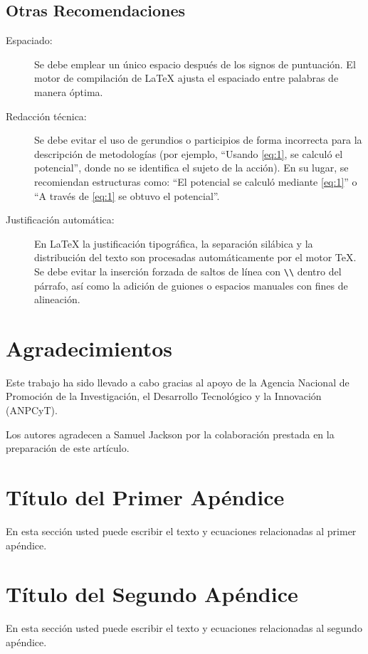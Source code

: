 \documentclass[a4paper, 12pt]{article}
\begin{document}
\subsection{Otras Recomendaciones}

\begin{description}
  \item[Espaciado:] Se debe emplear un único espacio después de los signos de puntuación. El motor de compilación de \LaTeX{} ajusta el espaciado entre palabras de manera óptima.
  \item[Redacción técnica:] Se debe evitar el uso de gerundios o participios de forma incorrecta para la descripción de metodologías (por ejemplo, “Usando \eqref{eq:1}, se calculó el potencial”, donde no se identifica el sujeto de la acción). En su lugar, se recomiendan estructuras como: “El potencial se calculó mediante \eqref{eq:1}” o “A través de \eqref{eq:1} se obtuvo el potencial”.
  \item[Justificación automática:] En \LaTeX{} la justificación tipográfica, la separación silábica y la distribución del texto son procesadas automáticamente por el motor TeX. Se debe evitar la inserción forzada de saltos de línea con \texttt{\textbackslash\textbackslash} dentro del párrafo, así como la adición de guiones o espacios manuales con fines de alineación.
\end{description}

\section*{Agradecimientos} %

Este trabajo ha sido llevado a cabo gracias al apoyo de la Agencia Nacional de Promoción de la Investigación, el Desarrollo Tecnológico y la Innovación (ANPCyT). 

Los autores agradecen a Samuel Jackson por la colaboración prestada en la preparación de este artículo.

\appendix
\renewcommand\thesection{Apéndice \Alph{section}} %

\section{Título del Primer Apéndice}
En esta sección usted puede escribir el texto y ecuaciones relacionadas al primer apéndice.

\section{Título del Segundo Apéndice}
En esta sección usted puede escribir el texto y ecuaciones relacionadas al segundo apéndice.
\end{document}

